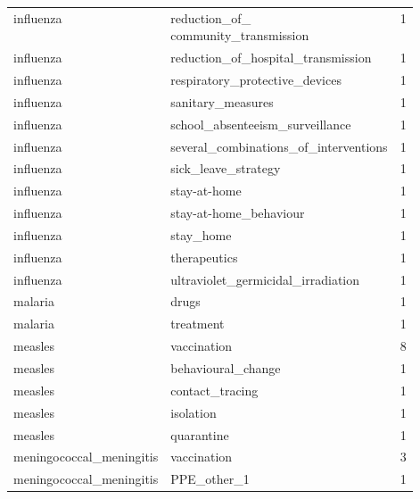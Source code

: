\documentclass[
]{article}
\begin{document}
\begin{longtable}{llr}
influenza &
\makecell[l]{
	 reduction\_of\_\\
	 community\_transmission
} & 1\\
 
influenza & reduction\_of\_hospital\_transmission & 1\\
 
influenza & respiratory\_protective\_devices & 1\\
 
influenza & sanitary\_measures & 1\\
 
influenza & school\_absenteeism\_surveillance & 1\\
 
influenza & several\_combinations\_of\_interventions & 1\\
 
influenza & sick\_leave\_strategy & 1\\
 
influenza & stay-at-home & 1\\
 
influenza & stay-at-home\_behaviour & 1\\
 
influenza & stay\_home & 1\\
 
influenza & therapeutics & 1\\
 
influenza & ultraviolet\_germicidal\_irradiation & 1\\
 
malaria & drugs & 1\\
 
malaria & treatment & 1\\
 
measles & vaccination & 8\\
 
measles & behavioural\_change & 1\\
 
measles & contact\_tracing & 1\\
 
measles & isolation & 1\\
 
measles & quarantine & 1\\
 
meningococcal\_meningitis & vaccination & 3\\
 
meningococcal\_meningitis & PPE\_other\_1 & 1\\
 

\end{longtable}
\end{document}
